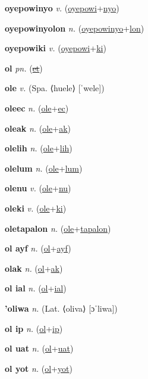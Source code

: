 \textbf{\hypertarget{oyepowinyo}{oyepowinyo}} \textit{v.} (\hyperlink{oyepowi}{oyepowi}+\allowbreak \hyperlink{nyo}{nyo})


\textbf{\hypertarget{oyepowinyolon}{oyepowinyolon}} \textit{n.} (\hyperlink{oyepowinyo}{oyepowinyo}+\allowbreak \hyperlink{lon}{lon})


\textbf{\hypertarget{oyepowiki}{oyepowiki}} \textit{v.} (\hyperlink{oyepowi}{oyepowi}+\allowbreak \hyperlink{ki}{ki})


\textbf{\hypertarget{ol}{ol}} \textit{pn.} (\hyperlink{et}{\sout{et}})


\textbf{\hypertarget{ole}{ole}} \textit{v.} (Spa. ⟨huele⟩ [ˈwele])


\textbf{\hypertarget{oleec}{oleec}} \textit{n.} (\hyperlink{ole}{ole}+\allowbreak \hyperlink{ec}{ec})


\textbf{\hypertarget{oleak}{oleak}} \textit{n.} (\hyperlink{ole}{ole}+\allowbreak \hyperlink{ak}{ak})


\textbf{\hypertarget{olelih}{olelih}} \textit{n.} (\hyperlink{ole}{ole}+\allowbreak \hyperlink{lih}{lih})


\textbf{\hypertarget{olelum}{olelum}} \textit{n.} (\hyperlink{ole}{ole}+\allowbreak \hyperlink{lum}{lum})


\textbf{\hypertarget{olenu}{olenu}} \textit{v.} (\hyperlink{ole}{ole}+\allowbreak \hyperlink{nu}{nu})


\textbf{\hypertarget{oleki}{oleki}} \textit{v.} (\hyperlink{ole}{ole}+\allowbreak \hyperlink{ki}{ki})


\textbf{\hypertarget{oletapalon}{oletapalon}} \textit{n.} (\hyperlink{ole}{ole}+\allowbreak \hyperlink{tapalon}{tapalon})


\textbf{\hypertarget{ol ayf}{ol ayf}} \textit{n.} (\hyperlink{ol}{ol}+\allowbreak \hyperlink{ayf}{ayf})


\textbf{\hypertarget{olak}{olak}} \textit{n.} (\hyperlink{ol}{ol}+\allowbreak \hyperlink{ak}{ak})


\textbf{\hypertarget{ol ial}{ol ial}} \textit{n.} (\hyperlink{ol}{ol}+\allowbreak \hyperlink{ial}{ial})


\textbf{\hypertarget{'oliwa}{'oliwa}} \textit{n.} (Lat. ⟨oliva⟩ [ɔˈliwa])


\textbf{\hypertarget{ol ip}{ol ip}} \textit{n.} (\hyperlink{ol}{ol}+\allowbreak \hyperlink{ip}{ip})


\textbf{\hypertarget{ol uat}{ol uat}} \textit{n.} (\hyperlink{ol}{ol}+\allowbreak \hyperlink{uat}{uat})


\textbf{\hypertarget{ol yot}{ol yot}} \textit{n.} (\hyperlink{ol}{ol}+\allowbreak \hyperlink{yot}{yot})


